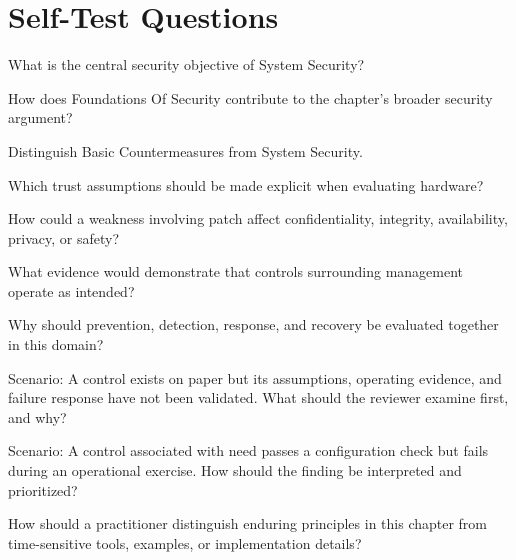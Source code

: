 \documentclass[11pt,letterpaper]{article}
\begin{document}
\section*{Self-Test Questions}
\begin{CornellRecallList}
\item What is the central security objective of System Security?
\item How does Foundations Of Security contribute to the chapter's broader security argument?
\item Distinguish Basic Countermeasures from System Security.
\item Which trust assumptions should be made explicit when evaluating hardware?
\item How could a weakness involving patch affect confidentiality, integrity, availability, privacy, or safety?
\item What evidence would demonstrate that controls surrounding management operate as intended?
\item Why should prevention, detection, response, and recovery be evaluated together in this domain?
\item Scenario: A control exists on paper but its assumptions, operating evidence, and failure response have not been validated. What should the reviewer examine first, and why?
\item Scenario: A control associated with need passes a configuration check but fails during an operational exercise. How should the finding be interpreted and prioritized?
\item How should a practitioner distinguish enduring principles in this chapter from time-sensitive tools, examples, or implementation details?
\end{CornellRecallList}
\end{document}
